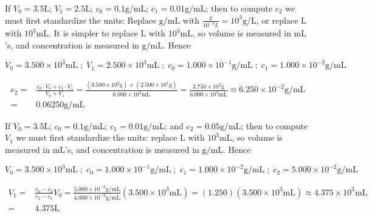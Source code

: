 \documentclass{article}
\begin{document}
\vspace{5mm}

If \(V_0 = 3.5\text{L}\); \(V_1 = 2.5\text{L}\); \(c_0 = 0.1\text{g/mL}\); \(c_1 = 0.01\text{g/mL}\); then to compute \(c_2\) we must first standardize the units: Replace \(\text{g/mL}\) with \(\frac{\text{g}}{10^{-3}L} = 10^3\text{g/L}\), or replace \(\text{L}\) with \(10^3\text{mL}\). It is simpler to replace \(\text{L}\) with \(10^3\text{mL}\), so volume is measured in \(\text{mL}\)'s, and concentration is measured in \(\text{g/mL}\). Hence

\[V_0 = 3.500 \times 10^3\text{mL} \;;\; V_1 = 2.500 \times 10^3\text{mL} \;;\; c_0 = 1.000 \times 10^{-1}\text{g/mL} \;;\; c_1 = 1.000 \times 10^{-2}\text{g/mL}\]

\begin{align*}
c_2 = & \frac{c_0 \cdot V_0 + c_1 \cdot V_1}{V_0 + V_1} 
= \frac{(3.500 \times 10^2\text{g}) + (2.500 \times 10^1\text{g})}{6.000 \times 10^3\text{mL}} 
= \frac{3.750 \times 10^2\text{g}}{6.000 \times 10^3\text{mL}} 
\approx 6.250 \times 10^{-2}\text{g/mL} \\
= & 0.06250 \text{g/mL}
\end{align*}

\vspace{5mm}

If \(V_0 = 3.5\text{L}\); \(c_0 = 0.1\text{g/mL}\); \(c_1 = 0.01\text{g/mL}\); and \(c_2 = 0.05\text{g/mL}\); then to compute \(V_1\) we must first standardize the units: replace \(\text{L}\) with \(10^3\text{mL}\), so volume is measured in \(\text{mL}\)'s, and concentration is measured in \(\text{g/mL}\). Hence 

\[V_0 = 3.500 \times 10^3\text{mL} \;;\; c_0 = 1.000 \times 10^{-1}\text{g/mL} \;;\; c_1 = 1.000 \times 10^{-2}\text{g/mL} \;;\; c_2 = 5.000 \times 10^{-2}\text{g/mL}\]

\begin{align*}
V_1 = & \frac{c_0 - c_2}{c_2 - c_1}V_0
= \frac{5.000 \times 10^{-2}\text{g/mL}}{4.000 \times 10^{-2}\text{g/mL}} (3.500 \times 10^3\text{mL})
= (1.250)(3.500 \times 10^3\text{mL}) 
\approx 4.375 \times 10^3\text{mL} \\
= & 4.375 \text{L}
\end{align*}
\end{document}
